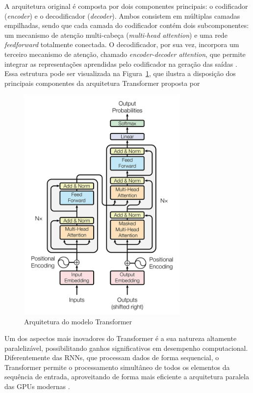 A arquitetura original é composta por dois componentes principais: o codificador (\textit{encoder}) e o decodificador (\textit{decoder}). Ambos consistem em múltiplas camadas empilhadas, sendo que cada camada do codificador contém dois subcomponentes: um mecanismo de atenção multi-cabeça (\textit{multi-head attention}) e uma rede \textit{feedforward} totalmente conectada. O decodificador, por sua vez, incorpora um terceiro mecanismo de atenção, chamado \textit{encoder-decoder attention}, que permite integrar as representações aprendidas pelo codificador na geração das saídas \cite{ankit2024transformer}.  Essa estrutura pode ser visualizada na Figura~\ref{fig:transformer}, que ilustra a disposição dos principais componentes da arquitetura Transformer proposta por 

\begin{figure}[H]
    \centering
    \includegraphics[width=0.75\textwidth]{imgs/transformer.png}
    \caption{Arquitetura do modelo Transformer \cite{vaswani2017}}
    \label{fig:transformer}
\end{figure}


Um dos aspectos mais inovadores do Transformer é a sua natureza altamente paralelizável, possibilitando ganhos significativos em desempenho computacional. Diferentemente das RNNs, que processam dados de forma sequencial, o Transformer permite o processamento simultâneo de todos os elementos da sequência de entrada, aproveitando de forma mais eficiente a arquitetura paralela das GPUs modernas \cite{ankit2024transformer}.

